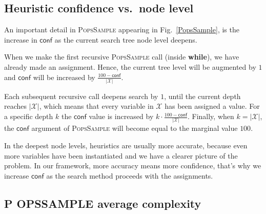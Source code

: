 \documentclass{ws-ijait}
\begin{document}
\subsection{Heuristic confidence vs.\ node level}

An important detail in \textsc{PopsSample} appearing in
Fig.~\ref{PopsSample}, is the increase in $\mathsf{conf}$ as
the current search tree node level deepens.

When we make the first recursive \textsc{PopsSample} call
(inside \textbf{while}), we have already made an assignment.
Hence, the current tree level will be augmented by $1$ and
$\mathsf{conf}$ will be increased by $\frac{100 -
\mathsf{conf}}{|\mathscr{X}|}$.

Each subsequent recursive call deepens search by $1$, until
the current depth reaches $|\mathscr{X}|$, which means that
every variable in $\mathscr{X}$ has been assigned a value.
For a specific depth $k$ the $\mathsf{conf}$ value is
increased by $k \cdot \frac{100 -
\mathsf{conf}}{|\mathscr{X}|}$. Finally, when $k =
|\mathscr{X}|$, the $\mathsf{conf}$ argument of
\textsc{PopsSample} will become equal to the marginal value
$100$.

In the deepest node levels, heuristics are usually more
accurate, because even more variables have been instantiated
and we have a clearer picture of the problem. In our
framework, more accuracy means more confidence, that's why
we increase $\mathsf{conf}$ as the search method proceeds
with the assignments.

\newcommand{\PoPS}{\textbf{\normalsize P\small O\normalsize
                           PS}}
\newcommand{\PopsSample}{\textbf{\normalsize P\small
                         OPS\normalsize S\small AMPLE}}

\subsection{\PopsSample{} average complexity}
\end{document}
